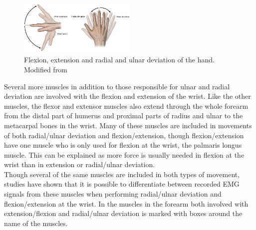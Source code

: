 \begin{figure}[H] 
	\includegraphics[width=0.5\textwidth]{figures/anatomy/flexexulradev}  %
	\caption{Flexion, extension and radial and ulnar deviation of the hand. Modified from \cite{zezo2016}}
	\label{fig:wristMove}
\end{figure}

Several more muscles in addition to those responsible for ulnar and radial deviation are involved with the flexion and extension of the wrist. Like the other muscles, the flexor and extensor muscles also extend through the whole forearm from the distal part of humerus and proximal parts of radius and ulnar to the metacarpal bones in the wrist. Many of these muscles are included in movements of both radial/ulnar deviation and flexion/extension, though flexion/extension have one muscle who is only used for flexion at the wrist, the palmaris longus muscle. This can be explained as more force is usually needed in flexion at the wrist than in extension or radial/ulnar deviation.\\
Though several of the same muscles are included in both types of movement, studies have shown that it is possible to differentiate between recorded EMG signals from these muscles when performing radial/ulnar deviation and flexion/extension at the wrist. \cite{hahne2014} In  the muscles in the forearm both involved with extension/flexion and radial/ulnar deviation is marked with boxes around the name of the muscles. 

